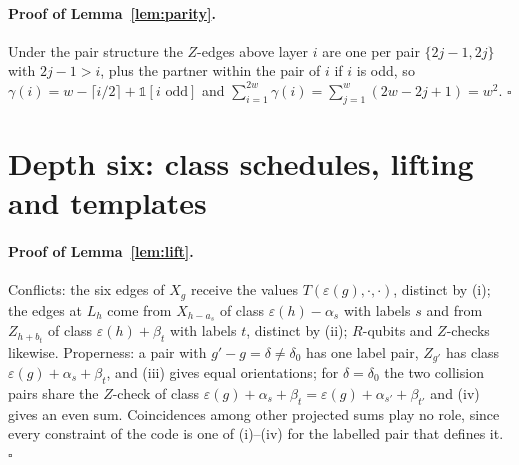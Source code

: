 \documentclass[reprint,twocolumn,superscriptaddress,nofootinbib]{revtex4-2}
\theoremstyle{plain}
\begin{document}
\paragraph*{Proof of Lemma~\ref{lem:parity}.}
Under the pair structure the $Z$-edges above layer $i$ are one per pair
$\{2j-1,2j\}$ with $2j-1>i$, plus the partner within the pair of $i$ if $i$
is odd, so $\gamma(i)=w-\lceil i/2\rceil+\mathbb{1}[i\text{ odd}]$ and
$\sum_{i=1}^{2w}\gamma(i)=\sum_{j=1}^w(2w-2j+1)=w^2$. \hfill$\square$

\section{Depth six: class schedules, lifting and templates}
\label{si:six}

\paragraph*{Proof of Lemma~\ref{lem:lift}.}
Conflicts: the six edges of $X_g$ receive the values
$T(\varepsilon(g),\cdot,\cdot)$, distinct by (i); the edges at $L_h$ come
from $X_{h-a_s}$ of class $\varepsilon(h)-\alpha_s$ with labels $s$ and from
$Z_{h+b_t}$ of class $\varepsilon(h)+\beta_t$ with labels $t$, distinct by
(ii); $R$-qubits and $Z$-checks likewise. Properness: a pair with
$g'-g=\delta\neq\delta_0$ has one label pair, $Z_{g'}$ has class
$\varepsilon(g)+\alpha_s+\beta_t$, and (iii) gives equal orientations; for
$\delta=\delta_0$ the two collision pairs share the $Z$-check of class
$\varepsilon(g)+\alpha_s+\beta_t=\varepsilon(g)+\alpha_{s'}+\beta_{t'}$
and (iv) gives an even sum. Coincidences among other projected sums play
no role, since every constraint of the code is one of (i)--(iv) for the
labelled pair that defines it. \hfill$\square$
\end{document}
